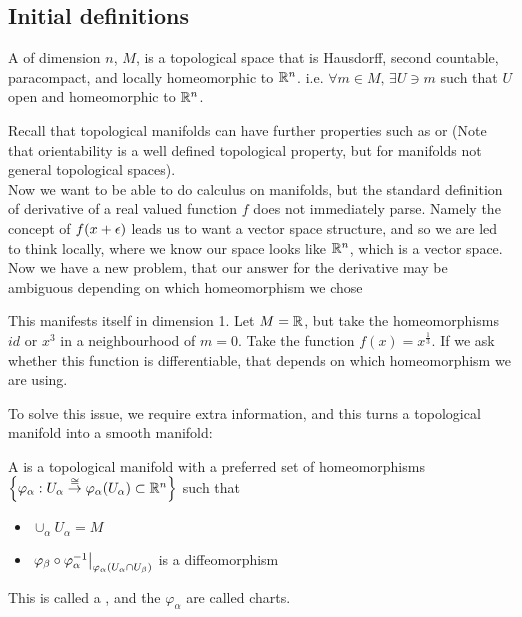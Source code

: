 \documentclass{article}
\begin{document}
\subsection{Initial definitions}
\begin{definition}
A  of dimension $n$, $M$, is a topological space that is Hausdorff, second countable, paracompact, and locally homeomorphic to $\mathbb{R}^n$. i.e. $\forall m \in M, \, \exists U \ni m$ such that $U$ open and homeomorphic to $\mathbb{R}^n$. 
\end{definition}
Recall that topological manifolds can have further properties such as  or  (Note that orientability is a well defined topological property, but for manifolds not general topological spaces). \\
Now we want to be able to do calculus on manifolds, but the standard definition of derivative of a real valued function $f$ does not immediately parse. Namely the concept of $f(x+\epsilon)$ leads us to want a vector space structure, and so we are led to think locally, where we know our space looks like $\mathbb{R}^n$, which is a vector space. Now we have a new problem, that our answer for the derivative may be ambiguous depending on which homeomorphism we chose 
\begin{example}
This manifests itself in dimension 1. Let $M = \mathbb{R}$, but take the homeomorphisms $id$ or $x^3$ in a neighbourhood of $m=0$. Take the function $f(x) = x^\frac{1}{3}$. If we ask whether this function is differentiable, that depends on which homeomorphism we are using. 
\end{example}
To solve this issue, we require extra information, and this turns a topological manifold into a smooth manifold:

\begin{definition}
A  is a topological manifold with a preferred set of homeomorphisms $\left\{ \varphi_\alpha: U_\alpha \overset{\cong}{\to} \varphi_\alpha(U_\alpha) \subset \mathbb{R}^n \right\}$ such that 
\begin{itemize}
    \item $\cup_\alpha U_\alpha = M$
    \item $\left. \varphi_\beta \circ \varphi_\alpha^{-1} \right\rvert_{\varphi_\alpha(U_\alpha \cap U_\beta)}$ is a diffeomorphism
\end{itemize}
This is called a , and the $\varphi_\alpha$ are called charts. 
\end{definition}
\end{document}
